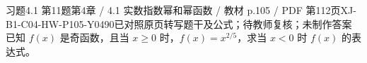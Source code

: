 \par\noindent\begin{minipage}{\linewidth}
\begin{bankitem}{习题4.1 第11题}{第4章 / 4.1 实数指数幂和幂函数 / 教材 p.105 / PDF 第112页}{XJ-B1-C04-HW-P105-Y0490}{已对照原页转写题干及公式；待教师复核；未制作答案}
已知 $f(x)$ 是奇函数，且当 $x\ge0$ 时，$f(x)=x^{2/5}$，求当 $x<0$ 时 $f(x)$ 的表达式。
\end{bankitem}
\end{minipage}\par\medskip
